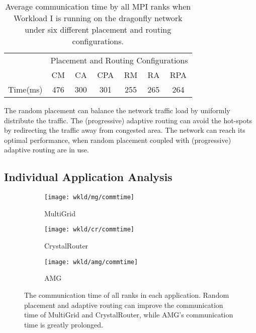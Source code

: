\begin{table}[ht]
\begin{center}
\caption{Average communication time by all MPI ranks when Workload I is running on the dragonfly network under six different placement and routing configurations.} 
\label{tab:wkld-commtime}
\begin{tabular}{l c c c c c c }
\toprule %
\toprule
&\multicolumn{6}{c}{Placement and Routing Configurations} \\ 
\cmidrule(l){2-7}
          & CM & CA & CPA & RM & RA & RPA \\ %
\midrule %
Time(ms)  & 476  & 300  & 301  & 255  & 265  & 264  \\ %

\midrule %
\bottomrule %
\end{tabular}
\end{center}
\end{table}


The random placement can balance the network traffic load by uniformly distribute the traffic. The (progressive) adaptive routing can avoid the hot-spots by redirecting the traffic away from congested area. The network can reach its optimal performance, when random placement coupled with (progressive) adaptive routing are in use. 






\subsection{Individual Application Analysis}
\label{sec: workload-1 app analysis}

\begin{figure*}[t!]
    \centering
    \begin{subfigure}[t]{0.32\textwidth}
        \centering
        \texttt{[image: wkld/mg/commtime]}
        \caption{MultiGrid}
        \label{fig:mg-commtime}
    \end{subfigure}%
    \hspace{1em}%
    \begin{subfigure}[t]{0.32\textwidth}
        \centering
        \texttt{[image: wkld/cr/commtime]}
        \caption{CrystalRouter}
        \label{fig:cr-commtime}
    \end{subfigure}%
    \hspace{1em}%
    \begin{subfigure}[t]{0.32\textwidth}
        \centering
        \texttt{[image: wkld/amg/commtime]}
        \caption{AMG}
        \label{fig:amg-commtime}
    \end{subfigure}%
    \caption{The communication time of all ranks in each application. Random placement and adaptive routing can improve the communication time of MultiGrid and CrystalRouter, while AMG's communication time is greatly prolonged.}
   \label{fig:apps-commtime}
\end{figure*}



